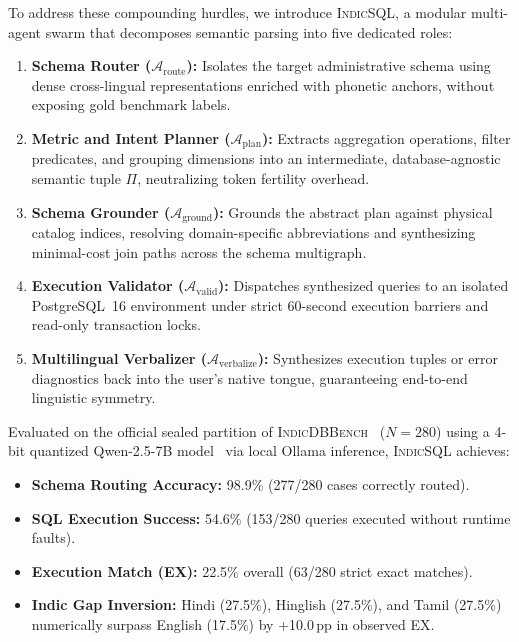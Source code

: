\documentclass[conference]{IEEEtran}
\begin{document}
To address these compounding hurdles, we introduce \textsc{IndicSQL}, a modular multi-agent swarm that decomposes semantic parsing into five dedicated roles:
\begin{enumerate}
    \item \textbf{Schema Router ($\mathcal{A}_{\text{route}}$):} Isolates the target administrative schema using dense cross-lingual representations enriched with phonetic anchors, without exposing gold benchmark labels.
    \item \textbf{Metric and Intent Planner ($\mathcal{A}_{\text{plan}}$):} Extracts aggregation operations, filter predicates, and grouping dimensions into an intermediate, database-agnostic semantic tuple $\Pi$, neutralizing token fertility overhead.
    \item \textbf{Schema Grounder ($\mathcal{A}_{\text{ground}}$):} Grounds the abstract plan against physical catalog indices, resolving domain-specific abbreviations and synthesizing minimal-cost join paths across the schema multigraph.
    \item \textbf{Execution Validator ($\mathcal{A}_{\text{valid}}$):} Dispatches synthesized queries to an isolated PostgreSQL~16 environment under strict 60-second execution barriers and read-only transaction locks.
    \item \textbf{Multilingual Verbalizer ($\mathcal{A}_{\text{verbalize}}$):} Synthesizes execution tuples or error diagnostics back into the user's native tongue, guaranteeing end-to-end linguistic symmetry.
\end{enumerate}

Evaluated on the official sealed partition of \textsc{IndicDBBench}~\cite{dawar2026indicdbbench} ($N = 280$) using a 4-bit quantized Qwen-2.5-7B model~\cite{qwen2024qwen2.5} via local Ollama inference, \textsc{IndicSQL} achieves:
\begin{itemize}
    \item \textbf{Schema Routing Accuracy:} 98.9\% (277/280 cases correctly routed).
    \item \textbf{SQL Execution Success:} 54.6\% (153/280 queries executed without runtime faults).
    \item \textbf{Execution Match (EX):} 22.5\% overall (63/280 strict exact matches).
    \item \textbf{Indic Gap Inversion:} Hindi (27.5\%), Hinglish (27.5\%), and Tamil (27.5\%) numerically surpass English (17.5\%) by +10.0\,pp in observed EX.
\end{itemize}
\end{document}
